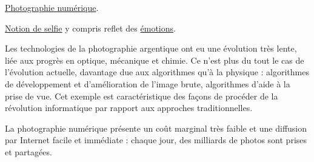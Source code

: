 
\begin{jazzitemize}
\item \href{https://fr.wikipedia.org/wiki/Photographie_num\%C3\%A9rique}{Photographie numérique}.
\item \href{https://pixees.fr/du-selfie-a-loeuvre-dart-interactiveintroduction/}{Notion de selfie} y compris reflet des \href{https://pixees.fr/le-selfie-reflet-dune-emotion/}{émotions}.
\end{jazzitemize}


\begin{tcolorbox}[title={Introduction}, toprule=0pt, leftrule=0pt, rightrule=0pt, arc=0pt,
                  fonttitle=\scshape\boxtitlefont,
                  colbacktitle=white, coltitle=firstcolor, colframe=firstcolor, colback=firstcolor!10,
                  breakable, enhanced jigsaw]
Les technologies de la photographie argentique ont eu une évolution très lente, liée aux progrès en optique, mécanique et chimie. Ce n’est plus du tout le cas de l’évolution actuelle, davantage due aux algorithmes qu’à la physique : algorithmes de développement et d’amélioration de l’image brute, algorithmes d’aide à la prise de vue. Cet exemple est caractéristique des façons de procéder de la révolution informatique par rapport aux approches traditionnelles.

La photographie numérique présente un coût marginal très faible et une diffusion par Internet facile et immédiate : chaque jour, des milliards de photos sont prises et partagées.
\end{tcolorbox}

